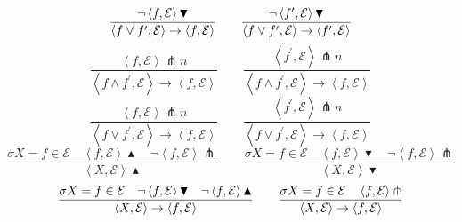 \begin{equation*}
\frac{\lnot \left\langle f,\mathcal{E}\right\rangle \blacktriangledown }{%
\left\langle f\vee f^{\prime },\mathcal{E}\right\rangle \rightarrow
\left\langle f,\mathcal{E}\right\rangle }\qquad \frac{\lnot \left\langle
f^{\prime },\mathcal{E}\right\rangle \blacktriangledown }{\left\langle f\vee
f^{\prime },\mathcal{E}\right\rangle \rightarrow \left\langle f^{\prime },%
\mathcal{E}\right\rangle }
\end{equation*}%
\begin{equation*}
\frac{\left\langle f,\mathcal{E}\right\rangle \pitchfork n}{\left\langle
f\wedge f^{\prime },\mathcal{E}\right\rangle \rightarrow \left\langle f,%
\mathcal{E}\right\rangle }\qquad \frac{\left\langle f^{\prime },\mathcal{E}%
\right\rangle \pitchfork n}{\left\langle f\wedge f^{\prime },\mathcal{E}%
\right\rangle \rightarrow \left\langle f,\mathcal{E}\right\rangle }
\end{equation*}%
\begin{equation*}
\frac{\left\langle f,\mathcal{E}\right\rangle \pitchfork n}{\left\langle
f\vee f^{\prime },\mathcal{E}\right\rangle \rightarrow \left\langle f,%
\mathcal{E}\right\rangle }\qquad \frac{\left\langle f^{\prime },\mathcal{E}%
\right\rangle \pitchfork n}{\left\langle f\vee f^{\prime },\mathcal{E}%
\right\rangle \rightarrow \left\langle f,\mathcal{E}\right\rangle }
\end{equation*}%
\begin{equation*}
\frac{\sigma X=f\in \mathcal{E}\quad \left\langle f,\mathcal{E}\right\rangle
\blacktriangle \quad \lnot \left\langle f,\mathcal{E}\right\rangle
\pitchfork }{\left\langle X,\mathcal{E}\right\rangle \blacktriangle }\qquad
\frac{\sigma X=f\in \mathcal{E}\quad \left\langle f,\mathcal{E}\right\rangle
\blacktriangledown \quad \lnot \left\langle f,\mathcal{E}\right\rangle
\pitchfork }{\left\langle X,\mathcal{E}\right\rangle \blacktriangledown }
\end{equation*}%
\begin{equation*}
\frac{\sigma X=f\in \mathcal{E}\quad \lnot \left\langle f,\mathcal{E}%
\right\rangle \blacktriangledown \quad \lnot \left\langle f,\mathcal{E}%
\right\rangle \blacktriangle }{\left\langle X,\mathcal{E}\right\rangle
\rightarrow \left\langle f,\mathcal{E}\right\rangle }\qquad \frac{\sigma
X=f\in \mathcal{E}\quad \left\langle f,\mathcal{E}\right\rangle \pitchfork }{%
\left\langle X,\mathcal{E}\right\rangle \rightarrow \left\langle f,\mathcal{E%
}\right\rangle }
\end{equation*}%
